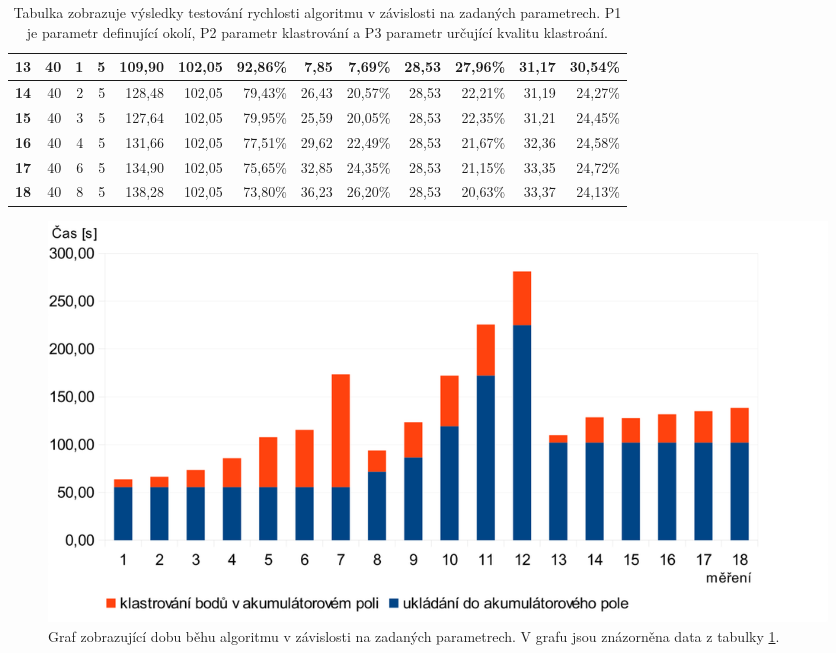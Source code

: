 \documentclass[11pt,twoside,a4paper]{book}
\begin{document}
\begin{table}[ht]
{\begin{tabular}{|r|r|r|r|r|r|r|r|r|r|r|r|r|}
\textbf{13} & 40 & 1 & 5 & 109,90 & 102,05 & 92,86\% & 7,85 & 7,69\% & 28,53 & 27,96\% & 31,17 & 30,54\% \\ \hline
\textbf{14} & 40 & 2 & 5 & 128,48 & 102,05 & 79,43\% & 26,43 & 20,57\% & 28,53 & 22,21\% & 31,19 & 24,27\% \\ \hline
\textbf{15} & 40 & 3 & 5 & 127,64 & 102,05 & 79,95\% & 25,59 & 20,05\% & 28,53 & 22,35\% & 31,21 & 24,45\% \\ \hline
\textbf{16} & 40 & 4 & 5 & 131,66 & 102,05 & 77,51\% & 29,62 & 22,49\% & 28,53 & 21,67\% & 32,36 & 24,58\% \\ \hline
\textbf{17} & 40 & 6 & 5 & 134,90 & 102,05 & 75,65\% & 32,85 & 24,35\% & 28,53 & 21,15\% & 33,35 & 24,72\% \\ \hline
\textbf{18} & 40 & 8 & 5 & 138,28 & 102,05 & 73,80\% & 36,23 & 26,20\% & 28,53 & 20,63\% & 33,37 & 24,13\% \\ \hline
\end{tabular}
}
\caption{Tabulka zobrazuje výsledky testování rychlosti algoritmu v závislosti na zadaných parametrech. P1 je parametr definující okolí, P2 parametr klastrování a P3 parametr určující kvalitu klastroání.} 
\label{table:test-cas}
\end{table}

\begin{figure}[H]
\begin{center}
\includegraphics[width=\textwidth]{figures/graf-test-cas}
\caption{Graf zobrazující dobu běhu algoritmu v závislosti na zadaných parametrech. V grafu jsou znázorněna data z tabulky \ref{table:test-cas}.}
\label{fig:graf-test-cas}
\end{center}
\end{figure}
\end{document}
